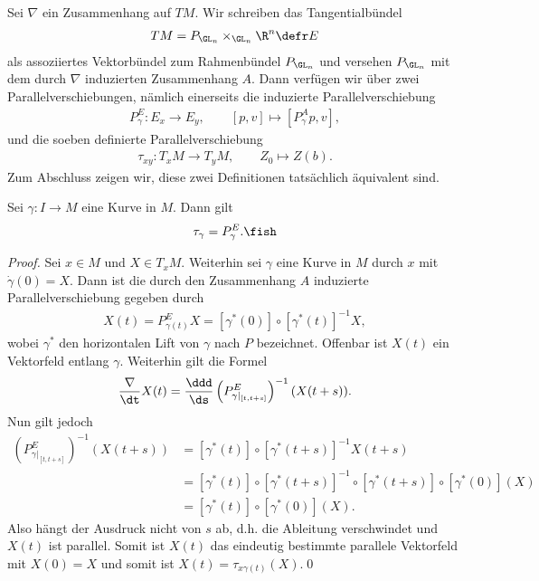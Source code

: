 \documentclass[%
	paper=a5,%
	fleqn,%
	DIV=18,%
	BCOR=0mm,
	fontsize=11pt,
	titlepage=false,%
	bibliography=totoc,
	DIV=18,%
	twoside=true,
	pdftitle=Riemannsche Geometrie,
	pdfauthor=Uwe Semmelmann,
	numbers=noendperiod]%
	{scrbook}
\begin{document}
Sei $\nabla$ ein Zusammenhang auf $TM$. Wir schreiben das Tangentialbündel
\begin{align*}
TM = P_{\GL_n}\times_{\GL_n} \R^n \defr E
\end{align*}
als assoziiertes Vektorbündel zum Rahmenbündel $P_{\GL_n}$ und versehen
$P_{\GL_n}$ mit dem durch $\nabla$ induzierten Zusammenhang $A$. Dann verfügen
wir über zwei Parallelverschiebungen, nämlich einerseits die induzierte
Parallelverschiebung
\begin{align*}
P^E_\gamma\colon E_x\to E_y,\qquad [p,v]\mapsto [P_\gamma^A p,v], 
\end{align*}
und die soeben definierte Parallelverschiebung
\begin{align*}
\tau_{xy}\colon T_xM\to T_yM,\qquad Z_0\mapsto Z(b). 
\end{align*}
Zum Abschluss zeigen wir, diese zwei Definitionen tatsächlich äquivalent sind.

\begin{prop}
Sei $\gamma\colon I\to M$ eine Kurve in $M$. Dann gilt
\begin{align*}
\tau_{\gamma} = P^E_{\gamma}.\fish
\end{align*}
\end{prop}
\begin{proof}
Sei $x\in M$ und $X\in T_xM$. Weiterhin sei $\gamma$ eine Kurve in $M$ durch $x$
mit $\dot{\gamma}(0) = X$. Dann ist die durch den Zusammenhang $A$ induzierte
Parallelverschiebung gegeben durch
\begin{align*}
X(t) = P^E_{\gamma(t)}X = [\gamma^*(0)]\circ [\gamma^*(t)]^{-1}X,
\end{align*}
wobei $\gamma^*$ den horizontalen Lift von $\gamma$ nach $P$ bezeichnet.
Offenbar ist $X(t)$ ein Vektorfeld entlang $\gamma$. Weiterhin gilt die Formel
\begin{align*}
\frac{\nabla}{\dt} X(t) = \frac{\ddd}{\ds}
\left(P_{\gamma|_{[t,t+s]}}^E\right)^{-1}(X(t+s)).
\end{align*}
Nun gilt jedoch
\begin{align*}
\left(P_{\gamma|_{[t,t+s]}}^E\right)^{-1}(X(t+s)) &=
[\gamma^*(t)]\circ [\gamma^*(t+s)]^{-1} X(t+s)\\
&= [\gamma^*(t)]\circ
[\gamma^*(t+s)]^{-1} \circ [\gamma^*(t+s)]\circ [\gamma^*(0)](X)\\
&= [\gamma^*(t)]\circ [\gamma^*(0)](X).
\end{align*}
Also hängt der Ausdruck nicht von $s$ ab, d.h. die Ableitung verschwindet
und $X(t)$ ist parallel. Somit ist $X(t)$ das eindeutig bestimmte parallele
Vektorfeld mit $X(0) = X$ und somit ist $X(t) = \tau_{x\gamma(t)}(X)$.\qed
\end{proof}
\end{document}
